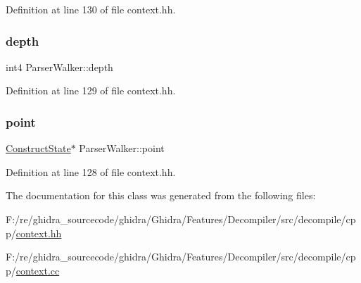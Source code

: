 Definition at line 130 of file context.\+hh.

\mbox{\label{class_parser_walker_a13ed53797769d934b958c01005401847}} 
\subsubsection{\texorpdfstring{depth}{depth}}
{\footnotesize\ttfamily int4 Parser\+Walker\+::depth\hspace{0.3cm}{\ttfamily [protected]}}



Definition at line 129 of file context.\+hh.

\mbox{\label{class_parser_walker_a78afa504d43d46dfc72b5796222e518c}} 
\subsubsection{\texorpdfstring{point}{point}}
{\footnotesize\ttfamily \mbox{\hyperlink{struct_construct_state}{Construct\+State}}$\ast$ Parser\+Walker\+::point\hspace{0.3cm}{\ttfamily [protected]}}



Definition at line 128 of file context.\+hh.



The documentation for this class was generated from the following files\+:\begin{DoxyCompactItemize}
\item 
F\+:/re/ghidra\+\_\+sourcecode/ghidra/\+Ghidra/\+Features/\+Decompiler/src/decompile/cpp/\mbox{\hyperlink{context_8hh}{context.\+hh}}\item 
F\+:/re/ghidra\+\_\+sourcecode/ghidra/\+Ghidra/\+Features/\+Decompiler/src/decompile/cpp/\mbox{\hyperlink{context_8cc}{context.\+cc}}\end{DoxyCompactItemize}
